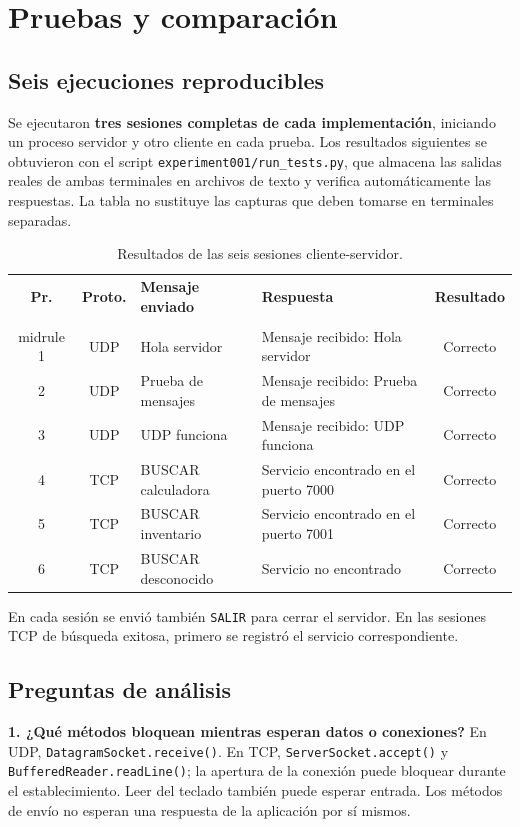 \documentclass[12pt,oneside]{book}
\begin{document}
\chapter{Pruebas y comparación}
\section{Seis ejecuciones reproducibles}
Se ejecutaron \textbf{tres sesiones completas de cada implementación}, iniciando un proceso servidor y otro cliente en cada prueba. Los resultados siguientes se obtuvieron con el script \texttt{experiment001/run\_tests.py}, que almacena las salidas reales de ambas terminales en archivos de texto y verifica automáticamente las respuestas. La tabla no sustituye las capturas que deben tomarse en terminales separadas.

\begin{table}[H]\centering\scriptsize
\caption{Resultados de las seis sesiones cliente-servidor.}
\begin{tabularx}{\textwidth}{c c L L c}
\toprule
\textbf{Pr.} & \textbf{Proto.} & \textbf{Mensaje enviado} & \textbf{Respuesta} & \textbf{Resultado}\\\\midrule
1 & UDP & Hola servidor & Mensaje recibido: Hola servidor & Correcto\\
2 & UDP & Prueba de mensajes & Mensaje recibido: Prueba de mensajes & Correcto\\
3 & UDP & UDP funciona & Mensaje recibido: UDP funciona & Correcto\\
4 & TCP & BUSCAR calculadora & Servicio encontrado en el puerto 7000 & Correcto\\
5 & TCP & BUSCAR inventario & Servicio encontrado en el puerto 7001 & Correcto\\
6 & TCP & BUSCAR desconocido & Servicio no encontrado & Correcto\\
\bottomrule
\end{tabularx}
\end{table}

En cada sesión se envió también \texttt{SALIR} para cerrar el servidor. En las sesiones TCP de búsqueda exitosa, primero se registró el servicio correspondiente.

\section{Preguntas de análisis}
\textbf{1. ¿Qué métodos bloquean mientras esperan datos o conexiones?} En UDP, \texttt{DatagramSocket.receive()}. En TCP, \texttt{ServerSocket.accept()} y \texttt{BufferedReader.readLine()}; la apertura de la conexión puede bloquear durante el establecimiento. Leer del teclado también puede esperar entrada. Los métodos de envío no esperan una respuesta de la aplicación por sí mismos.
\end{document}
